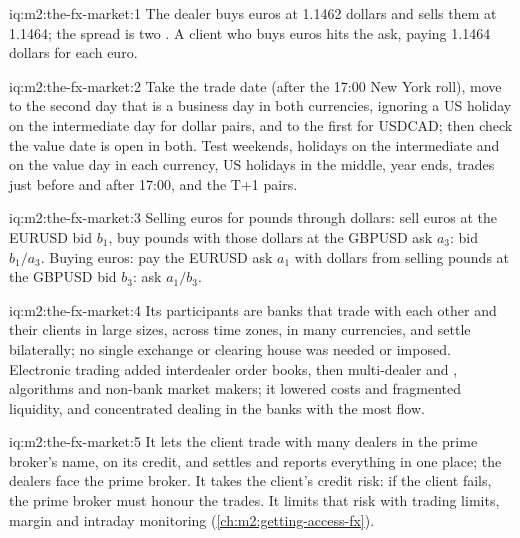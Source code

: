 \begin{solution}{iq:m2:the-fx-market:1}
The dealer buys euros at 1.1462 dollars and sells them at 1.1464; the spread is
two . A client who buys euros hits the ask, paying 1.1464 dollars for each
euro.
\end{solution}

\begin{solution}{iq:m2:the-fx-market:2}
Take the trade date (after the 17:00 New York roll), move to the second day that
is a business day in both currencies, ignoring a US holiday on the intermediate
day for dollar pairs, and to the first for USDCAD; then check the value date is
open in both. Test weekends, holidays on the intermediate and on the value day
in each currency, US holidays in the middle, year ends, trades just before and
after 17:00, and the T+1 pairs.
\end{solution}

\begin{solution}{iq:m2:the-fx-market:3}
Selling euros for pounds through dollars: sell euros at the EURUSD bid $b_1$,
buy pounds with those dollars at the GBPUSD ask $a_3$: bid $b_1/a_3$. Buying
euros: pay the EURUSD ask $a_1$ with dollars from selling pounds at the GBPUSD
bid $b_3$: ask $a_1/b_3$.
\end{solution}

\begin{solution}{iq:m2:the-fx-market:4}
Its participants are banks that trade with each other and their clients in
large sizes, across time zones, in many currencies, and settle bilaterally;
no single exchange or clearing house was needed or imposed. Electronic trading
added interdealer order books, then multi-dealer and ,
algorithms and non-bank market makers; it lowered costs and fragmented
liquidity, and concentrated dealing in the banks with the most flow.
\end{solution}

\begin{solution}{iq:m2:the-fx-market:5}
It lets the client trade with many dealers in the prime broker's name, on its
credit, and settles and reports everything in one place; the dealers face the
prime broker. It takes the client's credit risk: if the client fails, the prime
broker must honour the trades. It limits that risk with trading limits, margin
and intraday monitoring (\cref{ch:m2:getting-access-fx}).
\end{solution}

